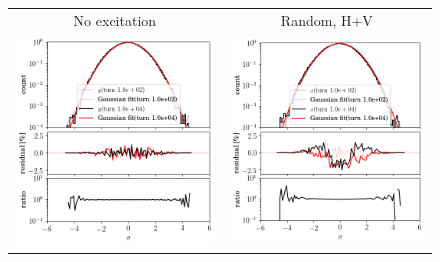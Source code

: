 \documentclass[
prstab
,reprint
,linenumbers
,longbibliography
,preprintnumbers
,showkeys
,amsfonts,amssymb,amsmath
,floatfix
]{revtex4-1}
\newlength{\bsrtwidth}
\begin{document}
\begin{figure}
  \begin{tabular}{cc}
    No excitation & Random, H+V \\
    \includegraphics[width=\bsrtwidth]{2016injerra2b2u_3_5um_hist_y.png} &
    \includegraphics[width=\bsrtwidth]{2016injerra2b2u_ranhv_3_5um_hist_x.png} \\

\end{tabular}
\end{figure}
\end{document}
